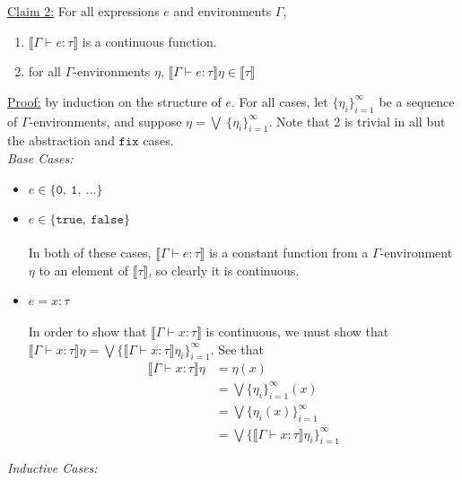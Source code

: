 \documentclass{westhesis}
\begin{document}
%
 \underline{Claim 2:} For all expressions $e$ and environments $\Gamma$,
\begin{enumerate}
\item $\llbracket \Gamma \vdash e : \tau \rrbracket$ is a continuous function. 
\item for all $\Gamma$-environments $\eta$, $\llbracket \Gamma \vdash e : \tau \rrbracket\eta \in \llbracket \tau \rrbracket$ 
\end{enumerate}
 \underline{Proof:} by induction on the structure of $e$. For all cases, let $\{ \eta_i \}^{\infty}_{i=1}$ be a sequence of $
 \Gamma$-environments, and suppose $ \eta = \bigvee \ \{ \eta_i \}^{\infty}_{i=1}$. Note that 2 is trivial in all but the abstraction
 and $\texttt{fix}$ cases.\\
 \emph{Base Cases: } 
 \begin{itemize}
 \item $e \in \{ \texttt{0}, \ \texttt{1}, \ \ldots \}$
 \item $e \in \{ \texttt{true}, \ \texttt{false} \}$\\ \\
  In both of these cases, $\llbracket \Gamma \vdash e : \tau \rrbracket$ is a constant function from a $\Gamma$-environment
 $\eta$ to an element of $\llbracket \tau \rrbracket$, so clearly it is continuous. 
 \item $e = x : \tau$ \\ \\
 In order to show that $\llbracket \Gamma \vdash x : \tau \rrbracket$ is continuous, we 
 must show that $\llbracket \Gamma \vdash x : \tau \rrbracket\eta = \bigvee \{ \llbracket \Gamma \vdash x : \tau \rrbracket
  \eta_i \}^{\infty}_{i=1}$. See that
  \begin{align*}
  \llbracket \Gamma \vdash x : \tau \rrbracket\eta &= \eta(x) \\
  &= \bigvee\{\eta_i\}^{\infty}_{i=1}(x) \\
  &= \bigvee\{\eta_i(x)\}^{\infty}_{i=1} \\
  &= \bigvee\{\llbracket \Gamma \vdash x : \tau \rrbracket\eta_i \}^{\infty}_{i=1}
  \end{align*}
 \end{itemize}
 \emph{Inductive Cases: }
\end{document}
